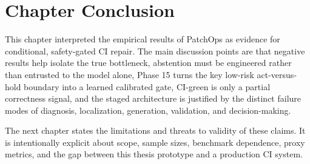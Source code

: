 \section{Chapter Conclusion}

This chapter interpreted the empirical results of PatchOps as evidence for conditional, safety-gated CI repair.
The main discussion points are that negative results help isolate the true bottleneck, abstention must be
engineered rather than entrusted to the model alone, Phase 15 turns the key low-risk act-versus-hold boundary
into a learned calibrated gate, CI-green is only a partial correctness signal, and the staged architecture is
justified by the distinct failure modes of diagnosis, localization, generation, validation, and decision-making.

The next chapter states the limitations and threats to validity of these claims. It is intentionally explicit
about scope, sample sizes, benchmark dependence, proxy metrics, and the gap between this thesis prototype and a
production CI system.
